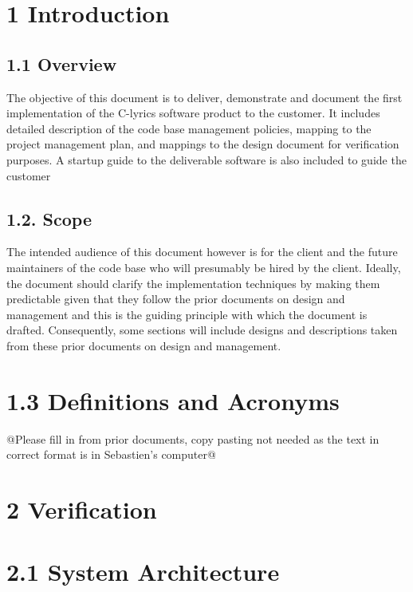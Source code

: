 \documentclass[]{article}
\author{}
\date{}
\begin{document}
\section{\textbf{1 Introduction}}\label{introduction}

\subsection{\textbf{1.1 Overview}}\label{overview}

The objective of this document is to deliver, demonstrate and document
the first implementation of the C-lyrics software product to the
customer. It includes detailed description of the code base management
policies, mapping to the project management plan, and mappings to the
design document for verification purposes. A startup guide to the
deliverable software is also included to guide the customer

\subsection{\textbf{1.2. Scope}}\label{scope}

The intended audience of this document however is for the client and the
future maintainers of the code base who will presumably be hired by the
client. Ideally, the document should clarify the implementation
techniques by making them predictable given that they follow the prior
documents on design and management and this is the guiding principle
with which the document is drafted. Consequently, some sections will
include designs and descriptions taken from these prior documents on
design and management.

\section{\textbf{1.3 Definitions and
Acronyms}}\label{definitions-and-acronyms}

@Please fill in from prior documents, copy pasting not needed as the
text in correct format is in Sebastien's computer@

\section{\textbf{2 Verification}}\label{verification}

\section{\textbf{2.1 System Architecture}}\label{system-architecture}
\end{document}

